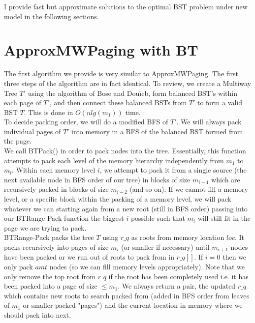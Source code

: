 \documentclass[letterpaper,12pt,titlepage,oneside,final]{book}
\theoremstyle{plain}
\begin{document}
I provide fast but approximate solutions to the optimal BST problem under new model in the following sections.

\section{ApproxMWPaging with BT}

The first algorithm we provide is very similar to ApproxMWPaging. The first three steps of the algorithm are in fact identical. To review, we create a Multiway Tree $T'$ using the algorithm of Bose and Dou\"{i}eb, form balanced BST's within each page of $T'$, and then connect these balanced BSTs from $T'$ to form a valid BST $T$. This is done in $O(n lg(m_1))$ time. \\

To decide packing order, we will do a modified BFS of $T'$. We will always pack individual pages of $T'$ into memory in a BFS of the balanced BST formed from the page. \\

We call BT\textendash Pack() in order to pack nodes into the tree. Essentially, this function attempts to pack each level of the memory hierarchy independently from $m_1$ to $m_l$. Within each memory level $i$, we attempt to pack it from a single source (the next available node in BFS order of our tree) in blocks of size  $m_{i-1}$ which are recursively packed in blocks of size $m_{i-2}$ (and so on). If we cannot fill a memory level, or a specific block within the packing of a memory level, we will pack whatever we can starting again from a new root (still in BFS order) passing into our BT\textendash Range-Pack function the biggest $i$ possible such that $m_i$ will still fit in the page we are trying to pack. \\

BT\textendash Range-Pack packs the tree $T$ using $r\_q$ as roots from memory location $loc$. It packs recursively into pages of size $m_i$ (or smaller if necessary) until $m_{i+1}$ nodes have been packed or we run out of roots to pack from in $r\_q[]$. If $i=0$ then we only pack $amt$ nodes (so we can fill memory levels appropriately). Note that we only remove the top root from $r\_q$ if the root has been completely used i.e. it has been packed into a page of size $\leq m_1$. We always return a pair, the updated $r\_q$ which contains new roots to search packed from (added in BFS order from leaves of $m_1$ or smaller packed "pages") and the current location in memory where we should pack into next. \\
\end{document}
